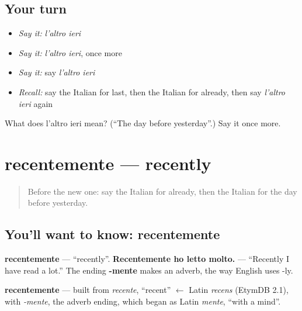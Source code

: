 \subsection*{Your turn}
\begin{itemize}
\raggedright
  \item \emph{Say it:} \emph{l'altro ieri}
  \item \emph{Say it:} \emph{l'altro ieri}, once more
  \item \emph{Say it:} say \emph{l'altro ieri}
  \item \emph{Recall:} say the Italian for last, then the Italian for already, then say \emph{l'altro ieri} again
\end{itemize}

\begin{tcolorbox}[breakable,colback=teal!4,colframe=teal!35!black,title={Before you move on}]
What does l'altro ieri mean? (\textquotedblleft{}The day before yesterday\textquotedblright{}.) Say it once more.
\end{tcolorbox}
\section[recentemente]{recentemente — recently}

\label{lesson:IT-C137-recentemente}



\begin{quote}
Before the new one: say the Italian for already, then the Italian for the day before yesterday.
\end{quote}

\subsection*{You'll want to know: recentemente}
\textbf{recentemente} — \textquotedblleft{}recently\textquotedblright{}. \textbf{Recentemente ho letto molto.} — \textquotedblleft{}Recently I have read a lot.\textquotedblright{} The ending \textbf{-mente} makes an adverb, the way English uses -ly.

\begin{cousinweb}
\textbf{recentemente} — built from \emph{recente}, \textquotedblleft{}recent\textquotedblright{} $\leftarrow$ Latin \emph{recens} (EtymDB 2.1), with \emph{-mente}, the adverb ending, which began as Latin \emph{mente}, \textquotedblleft{}with a mind\textquotedblright{}.
\end{cousinweb}

